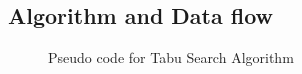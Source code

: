 \subsection{Algorithm and Data flow}
\begin{figure}[h]
	\centering
	\setlength \fboxsep{0pt}
	\setlength \fboxrule{0.5pt}
	\caption{Pseudo code for Tabu Search Algorithm}
	\label{fig:TSAlgorithmPseudoCode}
\end{figure}
